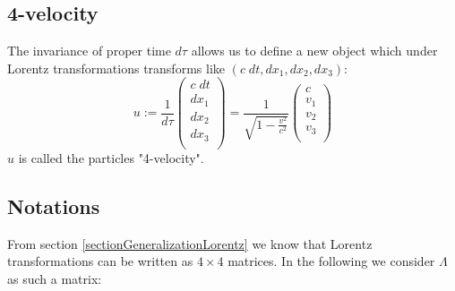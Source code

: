 \documentclass{article}
\begin{document}
\subsection{4-velocity} \label{section4Velocity}
The invariance of proper time $d\tau$ allows us to define a new object which under Lorentz transformations transforms like $(c \; dt,dx_1,dx_2,dx_3)$:
\begin{equation}
    u := \frac{1}{d \tau}
    \left(\begin{array}{c}
              c \; dt\\
              dx_1\\
              dx_2\\
              dx_3\\
    \end{array} \right)
    = \frac{1}{\sqrt{1-\frac{v^2}{c^2}}}
    \left(\begin{array}{c}
              c \\
              v_1\\
              v_2\\
              v_3\\
    \end{array} \right)
\end{equation}
$u$ is called the particles "4-velocity".

\subsection{Notations} \label{sectionNotations}
From section \ref{sectionGeneralizationLorentz} we know that Lorentz transformations can be written as $4 \times 4$ matrices.
In the following we consider $\Lambda$ as such a matrix:
\end{document}

